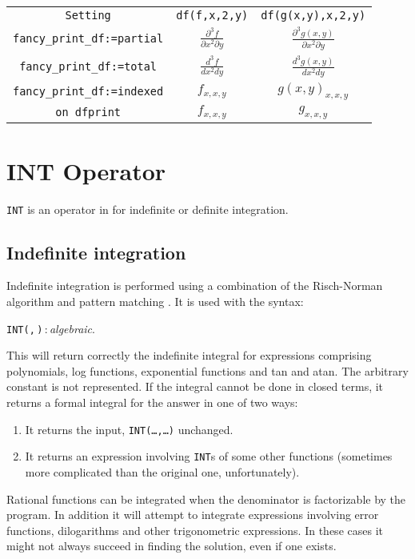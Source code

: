 \begin{tabular}{ccc}
  \texttt{Setting} & \texttt{df(f,x,2,y)} & \texttt{df(g(x,y),x,2,y)} \\
  \texttt{fancy\_print\_df:=partial} &
  \(\frac{\partial^3 f}{\partial x^2 \partial y}\) &
  \(\frac{\partial^3 g(x,y)}{\partial x^2 \partial y}\) \\
  \texttt{fancy\_print\_df:=total} & \(\frac{d^3 f}{d x^2 d y}\) &
  \(\frac{d^3 g(x,y)}{d x^2 d y}\) \\
  \texttt{fancy\_print\_df:=indexed} & \(f_{x,x,y}\) & \(g(x,y)_{x,x,y}\) \\
  \texttt{on dfprint} & \(f_{x,x,y}\) & \(g_{x,x,y}\)
\end{tabular}

\section{INT Operator}
\hypertarget{operator:INT}{}
\texttt{INT} is an operator in {\REDUCE} for indefinite or definite integration.

\subsection{Indefinite integration}
Indefinite
integration is performed using a
combination of the Risch-Norman algorithm and pattern matching \cite{Norman:77,Harrington:79,Norman:79}.
It is used with the syntax:
\begin{syntax}
  \texttt{INT(}\texttt{,}\,\texttt{)}\,:\,\textit{algebraic}.
\end{syntax}
This will return correctly the indefinite integral for expressions comprising
polynomials, log functions, exponential functions and tan and atan. The
arbitrary constant is not represented. If the integral cannot be done in
closed terms, it returns a formal integral for the answer in one of two ways:
\begin{enumerate}
\item It returns the input, \texttt{INT(\ldots,\ldots)} unchanged.

\item It returns an expression involving \texttt{INT}s of some
      other functions (sometimes more complicated than
      the original one, unfortunately).
\end{enumerate}
Rational functions can be integrated when the denominator is factorizable
by the program. In addition it will attempt to integrate expressions
involving error functions, dilogarithms and other trigonometric
expressions. In these cases it might not always succeed in finding the
solution, even if one exists.

